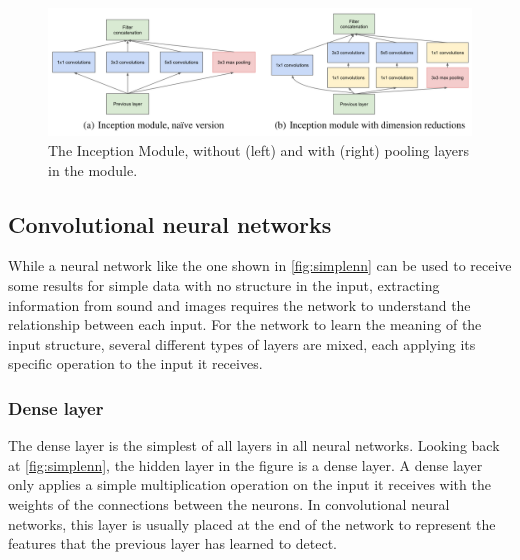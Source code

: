 \begin{figure}[htbp]  %
  \centering
  \includegraphics[width=.7\textwidth]{figures/google2.PNG}
  \caption{The Inception Module\cite{szegedy2014going}, without (left) and with (right) pooling layers in the module.}
  \label{fig:inception}
\end{figure}

\subsection{Convolutional neural networks}

While a neural network like the one shown in \cref{fig:simplenn} can be used to receive some results for simple data with no structure in the input, extracting information from sound and images requires the network to understand the relationship between each input. 
For the network to learn the meaning of the input structure, several different types of layers are mixed, each applying its specific operation to the input it receives.




\subsubsection{Dense layer}
The dense layer is the simplest of all layers in all neural networks.
Looking back at \cref{fig:simplenn}, the hidden layer in the figure is a dense layer.
A dense layer only applies a simple multiplication operation on the input it receives with the weights of the connections between the neurons.
In convolutional neural networks, this layer is usually placed at the end of the network to represent the features that the previous layer has learned to detect.



